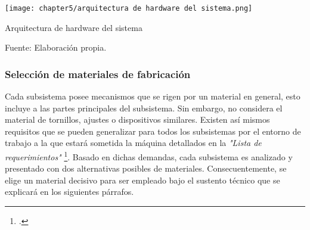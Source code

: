 \begin{myfigure}[H]
	\footnotesize\centering
	\texttt{[image: chapter5/arquitectura de hardware del sistema.png]}
	\caption{Arquitectura de hardware del sistema}
	\begin{myflushcenter}
		Fuente: Elaboración propia.
	\end{myflushcenter}
	\label{fig:arquitectura de hardware del sistema}
\end{myfigure}

\subsubsection{Selección de materiales de fabricación}
\label{sssec:seleccion de materiales de fabricacion}

Cada subsistema posee mecanismos que se rigen por un material en general, esto incluye a las partes principales del subsistema. Sin embargo, no considera el material de tornillos, ajustes o dispositivos similares. Existen así mismos requisitos que se pueden generalizar para todos los subsistemas por el entorno de trabajo a la que estará sometida la máquina detallados en la \textit{"Lista de requerimientos"} \footnote{\cite{DiazVergara2020}.}. Basado en dichas demandas, cada subsistema es analizado y presentado con dos alternativas posibles de materiales. Consecuentemente, se elige un material decisivo para ser empleado bajo el sustento técnico que se explicará en los siguientes párrafos.

